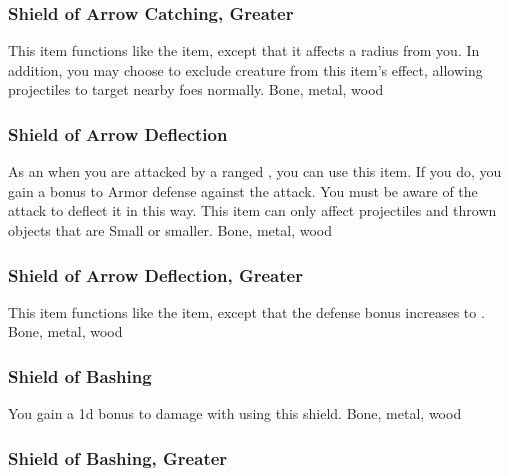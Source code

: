 \hypertarget{item:Shield of Arrow Catching, Greater}{\subsubsection{Shield of Arrow Catching, Greater\hfill{}}}
This item functions like the  item, except that it affects a \arealarge radius from you.
In addition, you may choose to exclude creature from this item's effect, allowing projectiles to target nearby foes normally.
 
 Bone, metal, wood
\lowercase{\hypertarget{item:Shield of Arrow Deflection}{}}\label{item:Shield of Arrow Deflection}
\hypertarget{item:Shield of Arrow Deflection}{\subsubsection{Shield of Arrow Deflection\hfill{}}}
As an  when you are attacked by a ranged , you can use this item.
If you do, you gain a  bonus to Armor defense against the attack.
You must be aware of the attack to deflect it in this way.
This item can only affect projectiles and thrown objects that are Small or smaller.
 
 Bone, metal, wood
\lowercase{\hypertarget{item:Shield of Arrow Deflection, Greater}{}}\label{item:Shield of Arrow Deflection, Greater}
\hypertarget{item:Shield of Arrow Deflection, Greater}{\subsubsection{Shield of Arrow Deflection, Greater\hfill{}}}
This item functions like the  item, except that the defense bonus increases to .
 
 Bone, metal, wood
\lowercase{\hypertarget{item:Shield of Bashing}{}}\label{item:Shield of Bashing}
\hypertarget{item:Shield of Bashing}{\subsubsection{Shield of Bashing\hfill{}}}
You gain a \plus1d bonus to damage with  using this shield.
 
 Bone, metal, wood
\lowercase{\hypertarget{item:Shield of Bashing, Greater}{}}\label{item:Shield of Bashing, Greater}
\hypertarget{item:Shield of Bashing, Greater}{\subsubsection{Shield of Bashing, Greater\hfill{}}}
